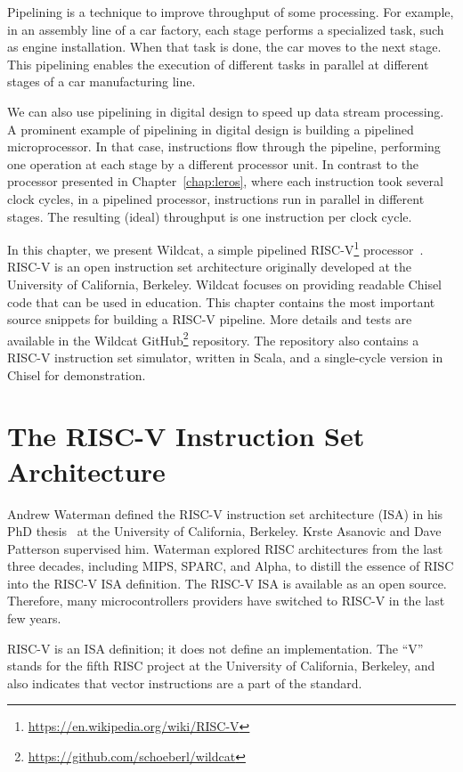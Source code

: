 \documentclass[%
    10pt,
    headinclude, footexclude,
    openright, %
    notitlepage,
    cleardoubleempty,
    headsepline,
    pointlessnumbers,
    bibtotoc, idxtotoc,
    ]{scrbook}
\newcommand{\myref}[2]{\href{#1}{#2}}
\renewcommand{\myref}[2]{{#2}{\footnote{\url{#1}}}}
\begin{document}
Pipelining is a technique to improve throughput of some processing.
For example, in an assembly line of a car factory, each stage performs a specialized task,
such as engine installation. When that task is done, the car moves to the next stage.
This pipelining enables the execution of different tasks in parallel at different stages of a car
manufacturing line.

We can also use pipelining in digital design to speed up data stream processing.
A prominent example of pipelining in digital design is building a pipelined microprocessor.
In that case, instructions flow through the pipeline, performing one operation at each stage
by a different processor unit. In contrast to the processor presented in Chapter~\ref{chap:leros},
where each instruction took several clock cycles, in a pipelined processor, instructions
run in parallel in different stages. The resulting (ideal) throughput is one instruction per clock cycle.

In this chapter, we present Wildcat, a simple pipelined
\myref{https://en.wikipedia.org/wiki/RISC-V}{RISC-V}
processor~\cite{wildcat:2024}.
RISC-V is an open instruction set architecture originally developed at the University of
California, Berkeley.
Wildcat focuses on providing readable Chisel code that can be used in education.
This chapter contains the most important source snippets for building a RISC-V pipeline.
More details and tests are available in the \myref{https://github.com/schoeberl/wildcat}{Wildcat GitHub}
repository. The repository also contains a RISC-V instruction set simulator, written in Scala, and a single-cycle version in Chisel for demonstration.

\section{The RISC-V Instruction Set Architecture}

Andrew Waterman defined the RISC-V instruction set architecture (ISA) in his
PhD thesis~\cite{Waterman:EECS-2016-1} at the University of California, Berkeley.
Krste Asanovic and Dave Patterson supervised him.
Waterman explored RISC architectures from the last three decades, including MIPS, SPARC, and Alpha,
to distill the essence of RISC into the RISC-V ISA definition.
The RISC-V ISA is available as an open source. Therefore, many microcontrollers
providers have switched to RISC-V in the last few years.

RISC-V is an ISA definition; it does not define an implementation.
The ``V'' stands for the fifth RISC project at the University of California, Berkeley, and also indicates that vector instructions are a part of the standard.
\end{document}

